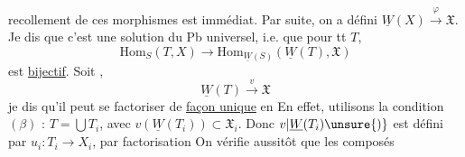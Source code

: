 recollement de ces morphismes est immédiat.
Par suite, on a défini $\underline W(X)\xrightarrow{\varphi}\mathfrak X$.
Je dis que c'est une solution du Pb universel, i.e. que pour tt $T$,
\[
\mathrm{Hom}_S(T,X)\longrightarrow
\mathrm{Hom}_{\underline W(S)}(\underline W(T),\mathfrak X)
\]
est \uline{bijectif}. Soit ,
\[
\underline W(T)\xrightarrow{v}\mathfrak X
\]
je dis qu'il peut se factoriser de \uline{façon unique} en
En effet, 
 
utilisons la condition $(\beta)$ : $T=\bigcup T_i$,
avec $v(\underline W(T_i))\subset\mathfrak X_i$. Donc
$v|\underline W(T_i)\unsure{)}$ est défini par $u_i:T_i\to X_i$,
par factorisation
On vérifie aussitôt que les composés
